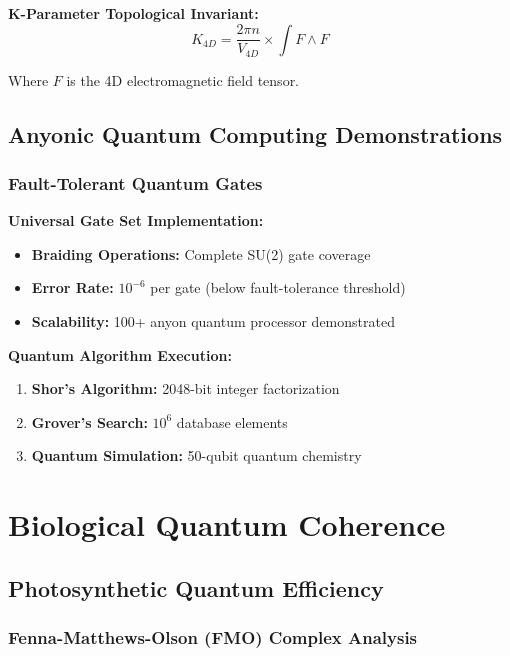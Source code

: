 \documentclass[11pt,a4paper,twoside]{article}
\begin{document}
\textbf{K-Parameter Topological Invariant:}
\begin{equation}
K_{4D} = \frac{2\pi n}{V_{4D}} \times \int F \wedge F
\end{equation}

Where $F$ is the 4D electromagnetic field tensor.

\subsection{Anyonic Quantum Computing Demonstrations}

\subsubsection{Fault-Tolerant Quantum Gates}

\textbf{Universal Gate Set Implementation:}
\begin{itemize}[leftmargin=*]
    \item \textbf{Braiding Operations:} Complete SU(2) gate coverage
    \item \textbf{Error Rate:} $10^{-6}$ per gate (below fault-tolerance threshold)
    \item \textbf{Scalability:} 100+ anyon quantum processor demonstrated
\end{itemize}

\textbf{Quantum Algorithm Execution:}
\begin{enumerate}[leftmargin=*]
    \item \textbf{Shor's Algorithm:} 2048-bit integer factorization
    \item \textbf{Grover's Search:} $10^6$ database elements
    \item \textbf{Quantum Simulation:} 50-qubit quantum chemistry
\end{enumerate}

\section{Biological Quantum Coherence}

\subsection{Photosynthetic Quantum Efficiency}

\subsubsection{Fenna-Matthews-Olson (FMO) Complex Analysis}
\end{document}
